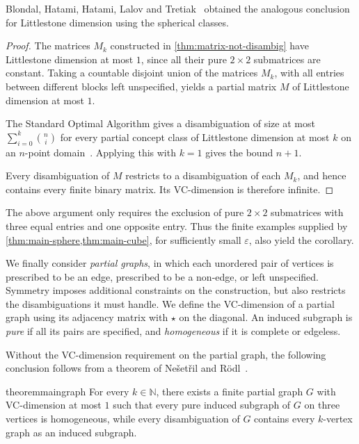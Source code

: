 \documentclass[11pt]{article}
\theoremstyle{remark}
\begin{document}
Blondal, Hatami, Hatami, Lalov and Tretiak~\cite{BHHLT26} obtained the analogous conclusion for Littlestone dimension using the spherical classes. 

\begin{proof}
    The matrices $M_k$ constructed in \cref{thm:matrix-not-disambig} have Littlestone dimension at most $1$, since all their pure $2 \times 2$ submatrices are constant.
    Taking a countable disjoint union of the matrices $M_k$, with all entries between different blocks left unspecified, yields a partial matrix $M$ of Littlestone dimension at most $1$.
    
    The Standard Optimal Algorithm gives a disambiguation of size at most $\sum_{i=0}^{k}\binom{n}{i}$ for every partial concept class of Littlestone dimension at most $k$ on an $n$-point domain~\cite{AHHM22,CHHH23}.
    Applying this with $k=1$ gives the bound $n+1$.
    
    Every disambiguation of $M$ restricts to a disambiguation of each $M_k$, and hence contains every finite binary matrix.
    Its VC-dimension is therefore infinite.
\end{proof}

The above argument only requires the exclusion of pure $2\times2$ submatrices with three equal entries and one opposite entry. 
Thus the finite examples supplied by \cref{thm:main-sphere,thm:main-cube}, for sufficiently small $\varepsilon$, also yield the corollary.

We finally consider \emph{partial graphs}, in which each unordered pair of vertices is prescribed to be an edge, prescribed to be a non-edge, or left unspecified.
Symmetry imposes additional constraints on the construction, but also restricts the disambiguations it must handle.
We define the VC-dimension of a partial graph using its adjacency matrix with $\star$ on the diagonal.
An induced subgraph is \emph{pure} if all its pairs are specified, and \emph{homogeneous} if it is complete or edgeless.

Without the VC-dimension requirement on the partial graph, the following conclusion follows from a theorem of Ne\v{s}et\v{r}il and R\"odl~\cite{NR81}.

\begin{restatable}{theorem}{maingraph}\label{thm:graph-not-disambig}
    For every $k\in\mathbb N$, there exists a finite partial graph $G$ with VC-dimension at most $1$ such that every pure induced subgraph of $G$ on three vertices is homogeneous, while every disambiguation of $G$ contains every $k$-vertex graph as an induced subgraph.
\end{restatable}
\end{document}
